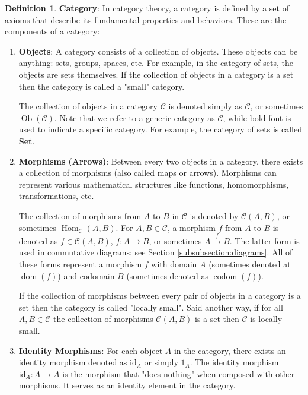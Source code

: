 \documentclass{article}
\theoremstyle{definition}
\newtheorem{definition}{Definition}[section]
\begin{document}
\bigskip
\begin{definition} {\bf Category}: 
In category theory, a category is defined by a set of axioms that
describe its fundamental properties and behaviors. These are the
components of a category:

\begin{enumerate} [label=(\roman*).]

\item {\bf Objects}: A category consists of a collection of
objects. These objects can be anything: sets, groups, spaces,
etc. For example, in the category of sets, the objects are sets
themselves. If the collection of objects in a category is a set 
then the category is called a "small" category.

\noindent
The collection of objects in a category $\mathcal{C}$ is denoted
simply as $\mathcal{C}$, or sometimes
$\operatorname{Ob}(\mathcal{C})$.  Note that we refer to a
generic category as $\mathcal{C}$, while bold font is used to
indicate a specific category. For example, the category of sets
is called {\bf Set}.

\item {\bf Morphisms (Arrows)}: Between every two objects in a
category, there exists a collection of morphisms (also called
maps or arrows). Morphisms can represent various mathematical
structures like functions, homomorphisms, transformations, etc.

{
\noindent
The collection of morphisms from $A$ to $B$ in $\mathcal{C}$ is
denoted by $\mathcal{C}(A,B)$, or sometimes
$\operatorname{Hom}_{\mathcal{C}}(A,B)$. For $A,B \in
\mathcal{C}$, a morphism $f$ from $A$ to $B$ is denoted as $f \in
\mathcal{C}(A,B)$, $f: A \to B$, or sometimes $A \xrightarrow{f}
B$. The latter form is used in commutative diagrams; see Section
\ref{subsubsection:diagrams}. All of these forms represent a
morphism $f$ with domain $A$ (sometimes denoted at
$\operatorname{dom}(f)$) and codomain $B$ (sometimes denoted as
$\operatorname{codom}(f)$). \par}

\medskip
\noindent
If the collection of morphisms between every pair of objects in 
a category is a set then the category is called "locally small".
Said another way, if for all $A,B \in \mathcal{C}$ the collection
of morphisms $\mathcal{C}(A,B)$ is a set then $\mathcal{C}$ is
locally small.
 
\item {\bf Identity Morphisms}: For each object $A$ in the
category, there exists an identity morphism denoted as
$\text{id}_A$ or simply $1_A$. The identity morphism
$\text{id}_A: A \to A$ is the morphism that "does nothing" when
composed with other morphisms. It serves as an identity element
in the category.
 

\end{enumerate}
\end{definition}
\end{document}
